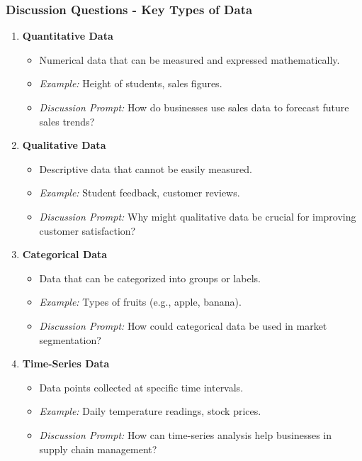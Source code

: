 \documentclass[aspectratio=169]{beamer}
\begin{document}
\begin{frame}[fragile]
    \frametitle{Discussion Questions - Key Types of Data}
    \begin{enumerate}
        \item \textbf{Quantitative Data}
            \begin{itemize}
                \item Numerical data that can be measured and expressed mathematically. 
                \item \textit{Example:} Height of students, sales figures.
                \item \textit{Discussion Prompt:} How do businesses use sales data to forecast future sales trends?
            \end{itemize}
            
        \item \textbf{Qualitative Data}
            \begin{itemize}
                \item Descriptive data that cannot be easily measured.
                \item \textit{Example:} Student feedback, customer reviews.
                \item \textit{Discussion Prompt:} Why might qualitative data be crucial for improving customer satisfaction?
            \end{itemize}
            
        \item \textbf{Categorical Data}
            \begin{itemize}
                \item Data that can be categorized into groups or labels.
                \item \textit{Example:} Types of fruits (e.g., apple, banana).
                \item \textit{Discussion Prompt:} How could categorical data be used in market segmentation?
            \end{itemize}
            
        \item \textbf{Time-Series Data}
            \begin{itemize}
                \item Data points collected at specific time intervals.
                \item \textit{Example:} Daily temperature readings, stock prices.
                \item \textit{Discussion Prompt:} How can time-series analysis help businesses in supply chain management?
            \end{itemize}
    \end{enumerate}
\end{frame}
\end{document}
